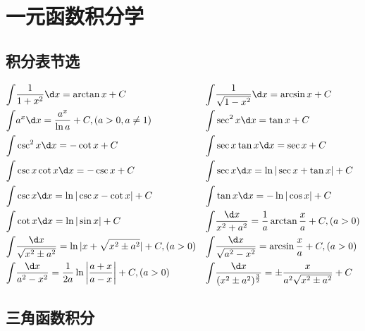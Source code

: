 \documentclass[12pt, a4paper, oneside, UTF8]{ctexbook}
\begin{document}
% 
\else
\fi
\chapter{一元函数积分学}
\section{积分表节选}
\begin{align*}
\int & \dfrac{1}{1+x^2} \d x = \arctan x + C &
\int & \dfrac{1}{\sqrt{1-x^2}} \d x = \arcsin x + C \\
\int & a^x \d x = \frac{a^x}{\ln a} + C, (a>0, a \neq 1) &
\int & \sec^2 x \d x = \tan x + C \\
\int & \csc^2 x \d x = -\cot x + C &
\int & \sec x \tan x \d x = \sec x + C \\
\int & \csc x \cot x \d x = -\csc x + C &
\int & \sec x \d x = \ln |\sec x + \tan x| + C \\
\int & \csc x \d x = \ln |\csc x - \cot x| + C &
\int & \tan x \d x = -\ln |\cos x| + C \\
\int & \cot x \d x = \ln |\sin x| + C &
\int & \dfrac{\d x}{x^2 + a^2} = \dfrac{1}{a} \arctan \dfrac{x}{a} + C,(a > 0) \\
\int & \dfrac{\d x}{\sqrt{x^2 \pm a^2}} = \ln |x + \sqrt{x^2 \pm a^2}| + C, (a > 0) &
\int & \dfrac{\d x}{\sqrt{a^2 - x^2}} = \arcsin \dfrac{x}{a} + C, (a > 0) \\
\int & \dfrac{\d x}{a^2 - x^2} = \dfrac{1}{2a} \ln \left| \dfrac{a+x}{a - x} \right| + C, (a > 0) &
\int & \dfrac{\d x}{(x^2 \pm a^2)^{\frac{3}{2}}} = \pm\dfrac{x}{a^2\sqrt{x^2 \pm a^2}} + C 
\end{align*}
\section{三角函数积分}
\end{document}
